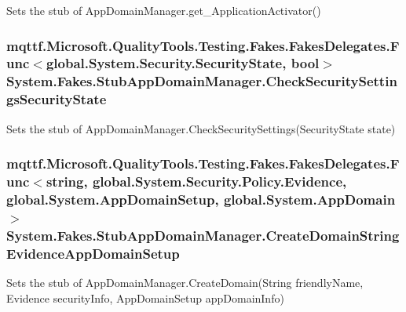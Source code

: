 Sets the stub of App\-Domain\-Manager.\-get\-\_\-\-Application\-Activator()

\hypertarget{class_system_1_1_fakes_1_1_stub_app_domain_manager_a7e96747f3775b94f9cddfbc1943de3f4}{
\subsubsection[{Check\-Security\-Settings\-Security\-State}]{\setlength{\rightskip}{0pt plus 5cm}mqttf.\-Microsoft.\-Quality\-Tools.\-Testing.\-Fakes.\-Fakes\-Delegates.\-Func$<$global.\-System.\-Security.\-Security\-State, bool$>$ System.\-Fakes.\-Stub\-App\-Domain\-Manager.\-Check\-Security\-Settings\-Security\-State}}\label{class_system_1_1_fakes_1_1_stub_app_domain_manager_a7e96747f3775b94f9cddfbc1943de3f4}


Sets the stub of App\-Domain\-Manager.\-Check\-Security\-Settings(\-Security\-State state)

\hypertarget{class_system_1_1_fakes_1_1_stub_app_domain_manager_a5537ac3e49346fd1a9380c662aeb642b}{
\subsubsection[{Create\-Domain\-String\-Evidence\-App\-Domain\-Setup}]{\setlength{\rightskip}{0pt plus 5cm}mqttf.\-Microsoft.\-Quality\-Tools.\-Testing.\-Fakes.\-Fakes\-Delegates.\-Func$<$string, global.\-System.\-Security.\-Policy.\-Evidence, global.\-System.\-App\-Domain\-Setup, global.\-System.\-App\-Domain$>$ System.\-Fakes.\-Stub\-App\-Domain\-Manager.\-Create\-Domain\-String\-Evidence\-App\-Domain\-Setup}}\label{class_system_1_1_fakes_1_1_stub_app_domain_manager_a5537ac3e49346fd1a9380c662aeb642b}


Sets the stub of App\-Domain\-Manager.\-Create\-Domain(\-String friendly\-Name, Evidence security\-Info, App\-Domain\-Setup app\-Domain\-Info)

